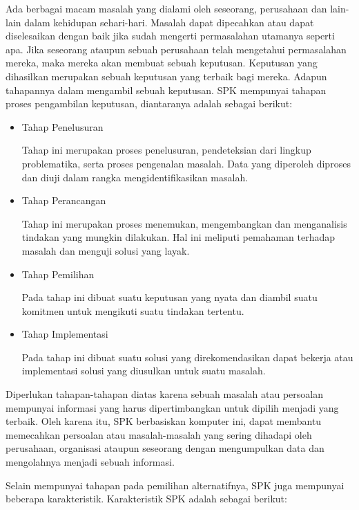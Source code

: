 \documentclass[a4paper,twoside]{article}
\begin{document}
\begin{enumerate}
	Ada berbagai macam masalah yang dialami oleh seseorang, perusahaan dan lain-lain dalam kehidupan sehari-hari. Masalah dapat dipecahkan atau dapat diselesaikan dengan baik jika sudah mengerti permasalahan utamanya seperti apa. Jika seseorang ataupun sebuah perusahaan telah mengetahui permasalahan mereka, maka mereka akan membuat sebuah keputusan. Keputusan yang dihasilkan merupakan sebuah keputusan yang terbaik bagi mereka. Adapun tahapannya dalam mengambil sebuah keputusan. SPK mempunyai tahapan proses pengambilan keputusan, diantaranya adalah sebagai berikut:
	\begin{itemize}
		\item Tahap Penelusuran
			
			Tahap ini merupakan proses penelusuran, pendeteksian dari lingkup problematika, serta proses pengenalan masalah. Data yang diperoleh diproses dan diuji dalam rangka mengidentifikasikan masalah.
		\item Tahap Perancangan
		
	Tahap ini merupakan proses menemukan, mengembangkan dan menganalisis tindakan yang mungkin dilakukan. Hal ini meliputi pemahaman terhadap masalah dan menguji solusi yang layak.
		\item Tahap Pemilihan
		
		Pada tahap ini dibuat suatu keputusan yang nyata dan diambil suatu komitmen untuk mengikuti suatu tindakan tertentu.
		\item Tahap Implementasi
		
		Pada tahap ini dibuat suatu solusi yang direkomendasikan dapat bekerja atau implementasi solusi yang diusulkan untuk suatu masalah.
		
	\end{itemize}
	
		Diperlukan tahapan-tahapan diatas karena sebuah masalah atau persoalan mempunyai informasi yang harus dipertimbangkan untuk dipilih menjadi yang terbaik. Oleh karena itu, SPK berbasiskan komputer ini, dapat membantu memecahkan persoalan atau masalah-masalah yang sering dihadapi oleh perusahaan, organisasi ataupun seseorang dengan mengumpulkan data dan mengolahnya menjadi sebuah informasi.
		
		Selain mempunyai tahapan pada pemilihan alternatifnya, SPK juga mempunyai beberapa karakteristik. Karakteristik SPK adalah sebagai berikut:
		

\end{enumerate}
\end{document}
